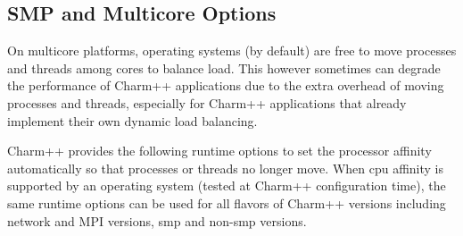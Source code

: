 \subsection{SMP and Multicore Options}

On multicore platforms, operating systems (by default) are free to move
processes and threads among cores to balance load. This however sometimes can
degrade the performance of Charm++ applications due to the extra overhead of
moving processes and threads, especially for Charm++ applications that already
implement their own dynamic load balancing.

Charm++ provides the following runtime options to set the processor affinity
automatically so that processes or threads no longer move. When cpu affinity
is supported by an operating system (tested at Charm++ configuration time),
the same runtime options can be used for all flavors of Charm++ versions
including network and MPI versions, smp and non-smp versions.

